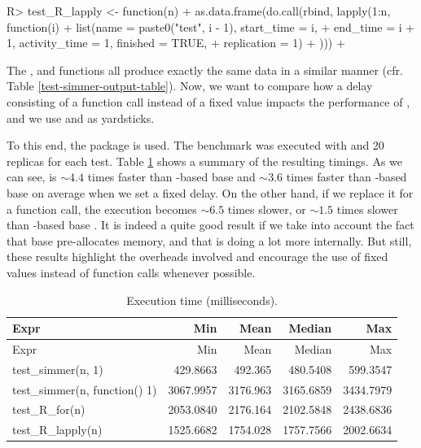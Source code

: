 \documentclass[
  nojss]{jss}
\begin{document}
\begin{CodeChunk}
\begin{CodeInput}
R> test_R_lapply <- function(n) {
+   as.data.frame(do.call(rbind, lapply(1:n, function(i) {
+     list(name = paste0("test", i - 1), start_time = i,
+       end_time = i + 1, activity_time = 1, finished = TRUE,
+       replication = 1)
+   })))
+ }
\end{CodeInput}
\end{CodeChunk}

The ,  and 
functions all produce exactly the same data in a similar manner (cfr.
Table \ref{test-simmer-output-table}). Now, we want to compare how a
delay consisting of a function call instead of a fixed value impacts the
performance of , and we use  and
 as yardsticks.

To this end, the  package
\citep{CRAN:microbenchmark} is used. The benchmark was executed with
 and 20 replicas for each test. Table
\ref{performance-table} shows a summary of the resulting timings. As we
can see,  is \(\sim4.4\) times faster than -based
base  and \(\sim3.6\) times faster than -based
base  on average when we set a fixed delay. On the other
hand, if we replace it for a function call, the execution becomes
\(\sim6.5\) times slower, or \(\sim1.5\) times slower than
-based base . It is indeed a quite good result if
we take into account the fact that base  pre-allocates
memory, and that  is doing a lot more internally. But still,
these results highlight the overheads involved and encourage the use of
fixed values instead of function calls whenever possible.

\begin{longtable}[]{@{}lrrrr@{}}
\caption{Execution time
(milliseconds).\label{performance-table}}\tabularnewline
\toprule
Expr & Min & Mean & Median & Max \\
\midrule
\endfirsthead
\toprule
Expr & Min & Mean & Median & Max \\
\midrule
\endhead
test\_simmer(n, 1) & 429.8663 & 492.365 & 480.5408 & 599.3547 \\
test\_simmer(n, function() 1) & 3067.9957 & 3176.963 & 3165.6859 &
3434.7979 \\
test\_R\_for(n) & 2053.0840 & 2176.164 & 2102.5848 & 2438.6836 \\
test\_R\_lapply(n) & 1525.6682 & 1754.028 & 1757.7566 & 2002.6634 \\
\bottomrule
\end{longtable}
\end{document}
